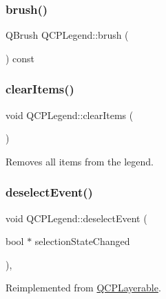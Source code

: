 \mbox{\label{class_q_c_p_legend_aaddafd5cbe9175512311350bb3b563e6}} 
\subsubsection{\texorpdfstring{brush()}{brush()}}
{\footnotesize\ttfamily Q\+Brush Q\+C\+P\+Legend\+::brush (\begin{DoxyParamCaption}{ }\end{DoxyParamCaption}) const\hspace{0.3cm}{\ttfamily [inline]}}

\mbox{\label{class_q_c_p_legend_a24795c7250eb5214fcea16b7217b4dfb}} 
\subsubsection{\texorpdfstring{clearItems()}{clearItems()}}
{\footnotesize\ttfamily void Q\+C\+P\+Legend\+::clear\+Items (\begin{DoxyParamCaption}{ }\end{DoxyParamCaption})}

Removes all items from the legend. \mbox{\label{class_q_c_p_legend_ac2066837f7ebc32a5b15434cdca5b176}} 
\subsubsection{\texorpdfstring{deselectEvent()}{deselectEvent()}}
{\footnotesize\ttfamily void Q\+C\+P\+Legend\+::deselect\+Event (\begin{DoxyParamCaption}\item[{bool $\ast$}]{selection\+State\+Changed }\end{DoxyParamCaption})\hspace{0.3cm}{\ttfamily [protected]}, {\ttfamily [virtual]}}



Reimplemented from \mbox{\hyperlink{class_q_c_p_layerable_ae546370644a5551c76af739afc008bee}{Q\+C\+P\+Layerable}}.

\mbox{\label{class_q_c_p_legend_a74f93358d2b4a76ec95c3a5d825582a3}} 
